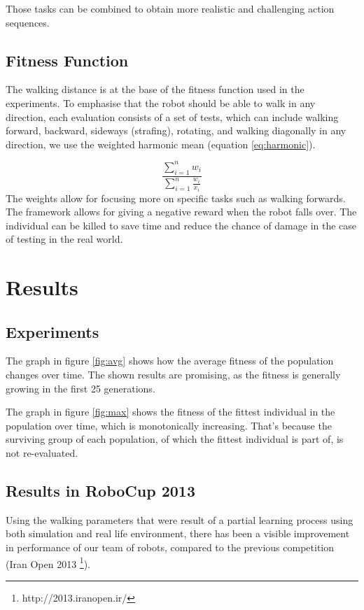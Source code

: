 \documentclass{article}
\begin{document}
Those tasks can be combined to obtain more realistic and challenging action sequences.

\subsection{Fitness Function}

The walking distance is at the base of the fitness function used in the 
experiments. To emphasise that the robot should be able to walk in any 
direction, each evaluation consists of a set of tests, which can include
walking forward, backward, sideways (strafing), rotating, and walking
diagonally in any direction, we use the weighted harmonic mean (equation
\ref{eq:harmonic}).

\begin{equation}
	\frac{\sum^{n}_{i=1} w_i} {\sum^{n}_{i=1}\frac{w_i}{x_i}}
    \label{eq:harmonic}
\end{equation}
The weights allow for focusing more on specific tasks such as walking forwards.
The framework allows for giving a negative reward when the robot falls over.
The individual can be killed to save time and reduce the chance of damage in
the case of testing in the real world.

\section{Results}

\subsection{Experiments}
The graph in figure \ref{fig:avg} shows how the average fitness of the population changes over time. The shown results are promising, as the fitness is generally growing in the first 25 generations. 

The graph in figure \ref{fig:max} shows the fitness of the fittest individual in the population over time, which is monotonically increasing. That's because the surviving group of each population, of which the fittest individual is part of, is not re-evaluated. 

\subsection{Results in RoboCup 2013}
Using the walking parameters that were result of a partial learning process using both simulation and real life environment, there has been a visible improvement in performance of our team of robots, compared to the previous competition (Iran Open 2013  \footnote{http://2013.iranopen.ir/}). 
\end{document}
